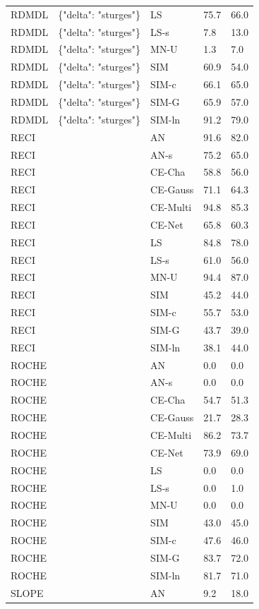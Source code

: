 \begin{tabular}{lllll}
RDMDL & \{"delta": "sturges"\} & LS & 75.7 & 66.0 \\
RDMDL & \{"delta": "sturges"\} & LS-s & 7.8 & 13.0 \\
RDMDL & \{"delta": "sturges"\} & MN-U & 1.3 & 7.0 \\
RDMDL & \{"delta": "sturges"\} & SIM & 60.9 & 54.0 \\
RDMDL & \{"delta": "sturges"\} & SIM-c & 66.1 & 65.0 \\
RDMDL & \{"delta": "sturges"\} & SIM-G & 65.9 & 57.0 \\
RDMDL & \{"delta": "sturges"\} & SIM-ln & 91.2 & 79.0 \\
RECI &  & AN & 91.6 & 82.0 \\
RECI &  & AN-s & 75.2 & 65.0 \\
RECI &  & CE-Cha & 58.8 & 56.0 \\
RECI &  & CE-Gauss & 71.1 & 64.3 \\
RECI &  & CE-Multi & 94.8 & 85.3 \\
RECI &  & CE-Net & 65.8 & 60.3 \\
RECI &  & LS & 84.8 & 78.0 \\
RECI &  & LS-s & 61.0 & 56.0 \\
RECI &  & MN-U & 94.4 & 87.0 \\
RECI &  & SIM & 45.2 & 44.0 \\
RECI &  & SIM-c & 55.7 & 53.0 \\
RECI &  & SIM-G & 43.7 & 39.0 \\
RECI &  & SIM-ln & 38.1 & 44.0 \\
ROCHE &  & AN & 0.0 & 0.0 \\
ROCHE &  & AN-s & 0.0 & 0.0 \\
ROCHE &  & CE-Cha & 54.7 & 51.3 \\
ROCHE &  & CE-Gauss & 21.7 & 28.3 \\
ROCHE &  & CE-Multi & 86.2 & 73.7 \\
ROCHE &  & CE-Net & 73.9 & 69.0 \\
ROCHE &  & LS & 0.0 & 0.0 \\
ROCHE &  & LS-s & 0.0 & 1.0 \\
ROCHE &  & MN-U & 0.0 & 0.0 \\
ROCHE &  & SIM & 43.0 & 45.0 \\
ROCHE &  & SIM-c & 47.6 & 46.0 \\
ROCHE &  & SIM-G & 83.7 & 72.0 \\
ROCHE &  & SIM-ln & 81.7 & 71.0 \\
SLOPE &  & AN & 9.2 & 18.0 \\

\end{tabular}
